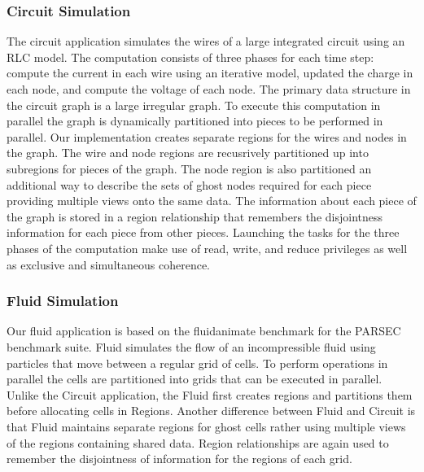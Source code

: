 \subsubsection{Circuit Simulation}
\label{subsec:circuit}
The circuit application simulates the wires of a large integrated circuit using an RLC
model.  The computation consists of three phases for each time step: compute the current in each wire using
an iterative model, updated the charge in each node, and compute the voltage of each node.
The primary data structure in the circuit graph is a large irregular graph.  To execute
this computation in parallel the graph is dynamically partitioned into pieces to be
performed in parallel.  Our implementation creates separate regions for the wires and
nodes in the graph.  The wire and node regions are recusrively partitioned up into
subregions for pieces of the graph.  The node region is also partitioned an additional way to 
describe the sets of ghost nodes required for each piece providing multiple views onto the
same data.  The information about each piece of the graph is stored
in a region relationship that remembers the disjointness information for each piece
from other pieces.  Launching the tasks for the three phases of the computation make 
use of read, write, and reduce privileges as well as exclusive and simultaneous coherence.

\subsubsection{Fluid Simulation}
\label{subsec:fluid}
Our fluid application is based on the fluidanimate benchmark for the PARSEC benchmark
suite\cite{bienia11benchmarking}.  Fluid simulates the flow of an incompressible fluid
using particles that move between a regular grid of cells.  To perform operations in 
parallel the cells are partitioned into grids that can be executed in parallel.  Unlike
the Circuit application, the Fluid first creates regions and partitions them before
allocating cells in Regions.  Another difference between Fluid and Circuit is that Fluid
maintains separate regions for ghost cells rather using multiple views of
the regions containing shared data.  Region relationships are again used to remember
the disjointness of information for the regions of each grid.

